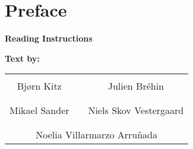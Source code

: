 \chapter*{Preface}
\vspace{-12 pt}

\textbf{Reading Instructions}
\vspace{-10 pt}

%
\textbf{Text by:}\\
\vspace{-12 pt}
\begin{table}[H]
	\centering
		\begin{tabular}{c c c}
			\underline{\phantom{JAERJAERJAERJAERGO}} & \phantom{cookies} & \underline{\phantom{JAERJAERJAERJAERGO}} \\
			Bjørn Kitz			& \phantom{cookies} & Julien Br\'ehin		\\
			&&\\
			\underline{\phantom{JAERJAERJAERJAERGO}} & \phantom{cookies} & \underline{\phantom{JAERJAERJAERJAERGO}} \\
			Mikael Sander			& \phantom{cookies} & Niels Skov Vestergaard		\\
			&&\\
	    \multicolumn{3}{c}{\underline{\phantom{JAERJAERJAERJAERGO}}}\\
	    \multicolumn{3}{c}{Noelia Villarmarzo Arruñada}\\				
		\end{tabular}
\end{table}
\pagebreak